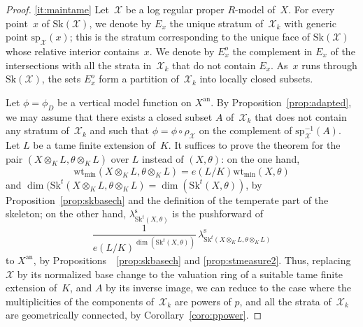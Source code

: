 \documentclass[11pt]{article}
\newcommand{\skpt}{\smallskip}
\theoremstyle{definition}
\numberwithin{equation}{subsection}
\newcommand{\cX}{\ensuremath{\mathscr{X}}}
\newcommand{\an}{\mathrm{an}}
\newcommand{\Sk}{\mathrm{Sk}}
\newcommand{\spe}{\mathrm{sp}}
\newcommand{\rs}{\mathrm{s}}
\newcommand{\wt}{\mathrm{wt}}
\let\form\theta
\let\Leb\lambda
\begin{document}
\skpt
\begin{proof}
\eqref{it:maintame}
Let~$\cX$ be a log regular proper $R$\nobreakdash-model of~$X$.
For every point~$x$ of $\Sk(\cX)$, we denote by $E_x$ the unique stratum of~$\cX_k$ with generic point $\spe_{\cX}(x)$; this is the stratum corresponding to the unique face of $\Sk(\cX)$ whose relative interior contains~$x$. We denote by $E_x^o$ the complement in $E_x$ of the intersections with all the strata in~$\cX_k$ that do not contain $E_x$.
As~$x$ runs through $\Sk(\cX)$, the sets $E_x^o$ form a partition of~$\cX_k$ into locally closed subsets.

Let $\phi=\phi_D$ be a vertical model function on $X^{\an}$. By Proposition~\ref{prop:adapted}, we may assume that there exists a closed subset $A$ of~$\cX_k$ that does not contain any stratum of~$\cX_k$ and such that
$\phi=\phi\circ \rho_{\cX}$ on the complement of $\spe^{-1}_{\cX}(A)$.
Let $L$ be a tame finite extension of~$K$. It suffices to prove the theorem for the pair $(X\otimes_K L,\form\otimes_K L)$ over $L$ instead of $(X,\form)$: on the one hand,
\[
\wt_{\min}(X\otimes_K L,\form\otimes_K L)=e(L/K)\wt_{\min}(X,\form)
\]
and $\dim(\Sk^t(X\otimes_K L,\form\otimes_K L)=\dim(\Sk^t(X,\form))$, by Proposition~\ref{prop:skbasech} and the definition of the temperate part of the skeleton; on the other hand,
$\Leb^{\rs}_{\Sk^t(X,\form)}$ is the pushforward of
\[
\frac{1}{e(L/K)^{\dim(\Sk^t(X,\form))}}\,\Leb^{\rs}_{\Sk^t(X\otimes_K L,\form\otimes_K L)}
\]
to $X^{\an}$, by Propositions~~\ref{prop:skbasech} and \ref{prop:stmeasure2}. Thus, replacing~$\cX$ by its normalized base change to the valuation ring of a suitable tame finite extension of~$K$, and $A$ by its inverse image, we can reduce to the case where the multiplicities of the components of~$\cX_k$ are powers of $p$, and all the strata of~$\cX_k$ are geometrically connected, by Corollary~\ref{coro:ppower}.


\end{proof}
\end{document}
